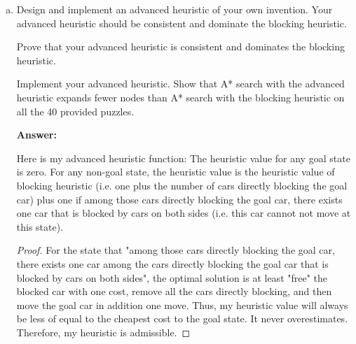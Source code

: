 \documentclass[12pt]{article}
\begin{document}
\begin{enumerate}[(a)]
{\bf Answer:}

\begin{proof}
Let $A$ be a valid state except the goal state, and $B$ be a successor of  $A$. Based on the blocking heuristic function, we can calculate $h(A)$ and $h(B)$. Then, the value of $h(A)$ and $h(B)$ represent the numbers of cars directly blocking the goal car. Additionally, we know that $B$ is the state that we take one more move on $A$. One additional move can at most remove one car that is blocking the goal car directly, which gives $h(A) - h(B) \leq 1$. Since we also know $cost(A,B) = 1$. We have
$$
h(A) - h(b) \leq cost(A, B)
$$
Therefore, by the definition of consistent heuristic, blocking heuristic is consistent.
\end{proof}



 
\item
Design and implement an advanced heuristic of your own invention. Your advanced heuristic should be consistent and dominate the blocking heuristic. 

Prove that your advanced heuristic is consistent and dominates the blocking heuristic.

Implement your advanced heuristic. Show that A* search with the advanced heuristic expands fewer nodes than A* search with the blocking heuristic on all the 40 provided puzzles.

{\bf Answer:}

Here is my advanced heuristic function: The heuristic value for any goal state is zero. For any non-goal state, the heuristic value is the heuristic value of blocking heuristic (i.e. one plus the number of cars directly blocking the goal car) plus one if among those cars directly blocking the goal car, there exists one car that is blocked by cars on both sides (i.e. this car cannot not move at this state).

\begin{proof}
For the state that "among those cars directly blocking the goal car, there exists one car among the cars directly blocking the goal car that is blocked by cars on both sides", the optimal solution is at least "free" the blocked car with one cost, remove all the cars directly blocking, and then move the goal car in addition one move. Thus, my heuristic value will always be less of equal to the cheapest cost to the goal state. It never overestimates. Therefore, my heuristic is admissible.


\end{proof}
\end{enumerate}
\end{document}
